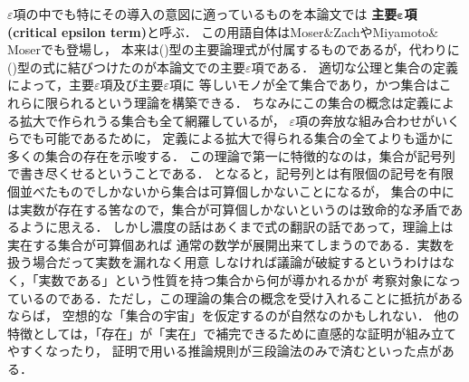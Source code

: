 	$\varepsilon$項の中でも特にその導入の意図に適っているものを本論文では
	{\bf 主要${\boldsymbol \varepsilon}$項}{\bf (critical epsilon term)}と呼ぶ．
	この用語自体はMoser$\&$Zach\cite{Moser_Zach}やMiyamoto$\&$Moser\cite{Miyamoto_Moser}でも登場し，
	本来は()型の主要論理式が付属するものであるが，代わりに
	()型の式に結びつけたのが本論文での主要$\varepsilon$項である．
	適切な公理と集合の定義によって，主要$\varepsilon$項及び主要$\varepsilon$項に
	等しいモノが全て集合であり，かつ集合はこれらに限られるという理論を構築できる．
	ちなみにこの集合の概念は定義による拡大で作られうる集合も全て網羅しているが，
	$\varepsilon$項の奔放な組み合わせがいくらでも可能であるために，
	定義による拡大で得られる集合の全てよりも遥かに多くの集合の存在を示唆する．
	この理論で第一に特徴的なのは，集合が記号列で書き尽くせるということである．
	となると，記号列とは有限個の記号を有限個並べたものでしかないから集合は可算個しかないことになるが，
	集合の中には実数が存在する筈なので，集合が可算個しかないというのは致命的な矛盾であるように思える．
	しかし濃度の話はあくまで式の翻訳の話であって，理論上は実在する集合が可算個あれば
	通常の数学が展開出来てしまうのである．実数を扱う場合だって実数を漏れなく用意
	しなければ議論が破綻するというわけはなく，「実数である」という性質を持つ集合から何が導かれるかが
	考察対象になっているのである．ただし，この理論の集合の概念を受け入れることに抵抗があるならば，
	空想的な「集合の宇宙」を仮定するのが自然なのかもしれない．
	他の特徴としては，「存在」が「実在」で補完できるために直感的な証明が組み立てやすくなったり，
	証明で用いる推論規則が三段論法のみで済むといった点がある．
	
